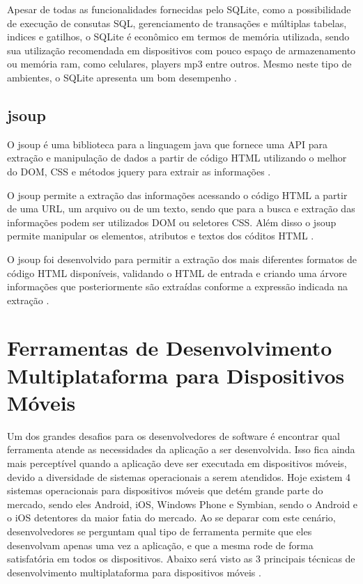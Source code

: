 Apesar de todas as funcionalidades fornecidas pelo SQLite, como a possibilidade de execução de consutas SQL, gerenciamento de transações e múltiplas tabelas, indices e gatilhos, o SQLite é econômico em termos de memória utilizada, sendo sua utilização recomendada em dispositivos com pouco espaço de armazenamento ou memória ram, como celulares, players mp3 entre outros. Mesmo neste tipo de ambientes, o SQLite apresenta um bom desempenho \cite{SQLite}.

\section{jsoup}
O jsoup é uma biblioteca para a linguagem java que fornece uma API para extração e manipulação de dados a partir de código HTML utilizando o melhor do DOM, CSS e métodos jquery para extrair as informações \cite{JSOUP}.

O jsoup permite a extração das informações acessando o código HTML a partir de uma URL, um arquivo ou de um texto, sendo que para a busca e extração das informações podem ser utilizados DOM ou seletores CSS. Além disso o jsoup permite manipular os elementos, atributos e textos dos códitos HTML \cite{JSOUP}.

O jsoup foi desenvolvido para permitir a extração dos mais diferentes formatos de código HTML disponíveis, validando o HTML de entrada e criando uma árvore informações que posteriormente são extraídas conforme a expressão indicada na extração \cite{JSOUP}.

\chapter{Ferramentas de Desenvolvimento Multiplataforma para Dispositivos Móveis}
Um dos grandes desafios para os desenvolvedores de software é encontrar qual ferramenta atende as necessidades da aplicação a ser desenvolvida. Isso fica ainda mais perceptível quando a aplicação deve ser executada em dispositivos móveis, devido a diversidade de sistemas operacionais a serem atendidos. Hoje existem 4 sistemas operacionais para dispositivos móveis que detém grande parte do mercado, sendo eles Android, iOS, Windows Phone e Symbian, sendo o Android e o iOS detentores da maior fatia do mercado. Ao se deparar com este cenário, desenvolvedores se perguntam qual tipo de ferramenta permite que eles desenvolvam apenas uma vez a aplicação, e que a mesma rode de forma satisfatória em todos os dispositivos. Abaixo será visto as 3 principais técnicas de desenvolvimento multiplataforma para dispositivos móveis \cite{CrossPlatformMobileDevelopment2011}.

